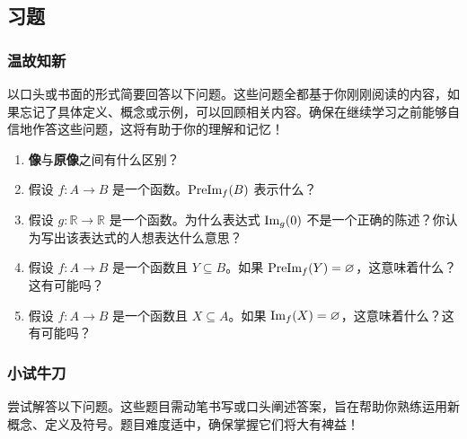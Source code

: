 
\subsection{习题}

\subsubsection*{温故知新}

以口头或书面的形式简要回答以下问题。这些问题全都基于你刚刚阅读的内容，如果忘记了具体定义、概念或示例，可以回顾相关内容。确保在继续学习之前能够自信地作答这些问题，这将有助于你的理解和记忆！

\begin{enumerate}[label=(\arabic*)]
    \item \textbf{像}与\textbf{原像}之间有什么区别？
    \item 假设 $f : A \to B$ 是一个函数。$\text{PreIm}_f (B)$ 表示什么？
    \item 假设 $g : \mathbb{R} \to \mathbb{R}$ 是一个函数。为什么表达式 $\text{Im}_g(0)$ 不是一个正确的陈述？你认为写出该表达式的人想表达什么意思？
    \item 假设 $f : A \to B$ 是一个函数且 $Y \subseteq B$。如果 $\text{PreIm}_f (Y) = \varnothing$，这意味着什么？这有可能吗？
    \item 假设 $f : A \to B$ 是一个函数且 $X \subseteq A$。如果 $\text{Im}_f (X) = \varnothing$，这意味着什么？这有可能吗？
\end{enumerate}

\subsubsection*{小试牛刀}

尝试解答以下问题。这些题目需动笔书写或口头阐述答案，旨在帮助你熟练运用新概念、定义及符号。题目难度适中，确保掌握它们将大有裨益！

